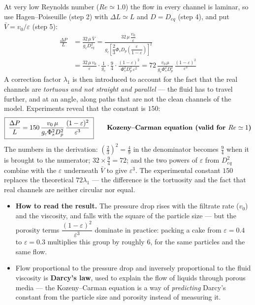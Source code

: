 \documentclass[10pt,a4paper]{article}
\newcommand{\spsub}[1]{\par\addvspace{7pt}\noindent{\color{accent}\bfseries #1}\par\addvspace{3pt}\nopagebreak}
\begin{document}
\spsub{Step 6 --- Kozeny--Carman equation}
\begin{formulabox}
At very low Reynolds number ($Re\simeq1.0$) the flow in every channel is laminar, so use Hagen--Poiseuille (step 2) with $\Delta L\simeq L$ and $D=D_{eq}$ (step 4), and put $\bar V=v_0/\varepsilon$ (step 5):
\begin{align*}
\frac{\Delta P}{L}&=\frac{32\,\mu\,\bar V}{g_cD_{eq}^2}
 =\frac{32\,\mu\,\dfrac{v_0}{\varepsilon}}
 {g_c\left[\dfrac{2}{3}\Phi_sD_p\left(\dfrac{\varepsilon}{1-\varepsilon}\right)\right]^{2}}\\[3pt]
 &=\frac{32\,\mu\,v_0}{\varepsilon}\cdot
 \frac{1}{g_c}\cdot\frac{9}{4}\cdot\frac{(1-\varepsilon)^2}{\Phi_s^2D_p^2\,\varepsilon^2}
 =72\,\frac{v_0\,\mu}{g_c\Phi_s^2D_p^2}\,\frac{(1-\varepsilon)^2}{\varepsilon^3}
\end{align*}
A correction factor $\lambda_1$ is then introduced to account for the fact that the real channels are \emph{tortuous and not straight and parallel} --- the fluid has to travel further, and at an angle, along paths that are not the clean channels of the model. Experiments reveal that the constant is $150$:
\[\boxed{\;\frac{\Delta P}{L}=150\,\frac{v_0\,\mu}{g_c\Phi_s^2D_p^2}\,\frac{(1-\varepsilon)^2}{\varepsilon^3}\;}
\qquad\text{\textbf{Kozeny--Carman equation (valid for }$Re\simeq1$\textbf{)}}\]
\vspace{2pt}
{\small The numbers in the derivation: $\left(\frac{2}{3}\right)^2=\frac{4}{9}$ in the denominator becomes $\frac{9}{4}$ when it is brought to the numerator; $32\times\frac{9}{4}=72$; and the two powers of $\varepsilon$ from $D_{eq}^2$ combine with the $\varepsilon$ underneath $\bar V$ to give $\varepsilon^3$. The experimental constant $150$ replaces the theoretical $72\lambda_1$ --- the difference is the tortuosity and the fact that real channels are neither circular nor equal.}
\end{formulabox}
\begin{itemize}
  \item \textbf{How to read the result.} The pressure drop rises with the filtrate rate ($v_0$) and the viscosity, and falls with the square of the particle size --- but the porosity terms $\dfrac{(1-\varepsilon)^2}{\varepsilon^3}$ dominate in practice: packing a cake from $\varepsilon=0.4$ to $\varepsilon=0.3$ multiplies this group by roughly $6$, for the same particles and the same flow.
  \item Flow proportional to the pressure drop and inversely proportional to the fluid viscosity is \textbf{Darcy's law}, used to explain the flow of liquids through porous media --- the Kozeny--Carman equation is a way of \emph{predicting} Darcy's constant from the particle size and porosity instead of measuring it.
\end{itemize}
\end{document}

